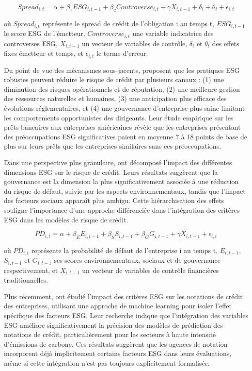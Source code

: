 \begin{equation}
Spread_{i,t} = \alpha + \beta_1 ESG_{i,t-1} + \beta_2 Controverse_{i,t} + \gamma X_{i,t-1} + \delta_i + \theta_t + \epsilon_{i,t}
\end{equation}

où $Spread_{i,t}$ représente le spread de crédit de l'obligation i au temps t, $ESG_{i,t-1}$ le score ESG de l'émetteur, $Controverse_{i,t}$ une variable indicatrice des controverses ESG, $X_{i,t-1}$ un vecteur de variables de contrôle, $\delta_i$ et $\theta_t$ des effets fixes émetteur et temps, et $\epsilon_{i,t}$ le terme d'erreur.

Du point de vue des mécanismes sous-jacents, \citet{goss2011} proposent que les pratiques ESG robustes peuvent réduire le risque de crédit par plusieurs canaux : (1) une diminution des risques opérationnels et de réputation, (2) une meilleure gestion des ressources naturelles et humaines, (3) une anticipation plus efficace des évolutions réglementaires, et (4) une gouvernance d'entreprise plus saine limitant les comportements opportunistes des dirigeants. Leur étude empirique sur les prêts bancaires aux entreprises américaines révèle que les entreprises présentant des préoccupations ESG significatives paient en moyenne 7 à 18 points de base de plus sur leurs prêts que les entreprises similaires sans ces préoccupations.

Dans une perspective plus granulaire, \citet{dorfleitner2020} ont décomposé l'impact des différentes dimensions ESG sur le risque de crédit. Leurs résultats suggèrent que la gouvernance est la dimension la plus significativement associée à une réduction du risque de défaut, suivie par les aspects environnementaux, tandis que l'impact des facteurs sociaux apparaît plus ambigu. Cette hiérarchisation des effets souligne l'importance d'une approche différenciée dans l'intégration des critères ESG dans les modèles de risque de crédit.

\begin{equation}
PD_{i,t} = \alpha + \beta_E E_{i,t-1} + \beta_S S_{i,t-1} + \beta_G G_{i,t-1} + \gamma X_{i,t-1} + \epsilon_{i,t}
\end{equation}

où $PD_{i,t}$ représente la probabilité de défaut de l'entreprise i au temps t, $E_{i,t-1}$, $S_{i,t-1}$ et $G_{i,t-1}$ ses scores environnementaux, sociaux et de gouvernance respectivement, et $X_{i,t-1}$ un vecteur de variables de contrôle financières traditionnelles.

Plus récemment, \citet{nemoto2022} ont étudié l'impact des critères ESG sur les notations de crédit des entreprises, utilisant une approche de machine learning pour isoler l'effet spécifique des facteurs ESG. Leur recherche indique que l'intégration des variables ESG améliore significativement la précision des modèles de prédiction des notations de crédit, particulièrement pour les secteurs à haute intensité d'émissions de carbone. Ces résultats suggèrent que les agences de notation incorporent déjà implicitement certains facteurs ESG dans leurs évaluations, même si cette intégration n'est pas toujours explicitement formalisée.

